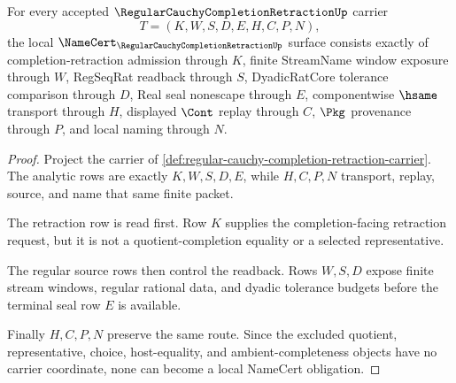 \begin{theorem}
\label{thm:regular-cauchy-completion-retraction-namecert-obligations}
For every accepted $\RegularCauchyCompletionRetractionUp$ carrier
$$
T=(K,W,S,D,E,H,C,P,N),
$$
the local $\NameCert_{\RegularCauchyCompletionRetractionUp}$ surface consists exactly of completion-retraction admission through $K$, finite StreamName window exposure through $W$, RegSeqRat readback through $S$, DyadicRatCore tolerance comparison through $D$, Real seal nonescape through $E$, componentwise $\hsame$ transport through $H$, displayed $\Cont$ replay through $C$, $\Pkg$ provenance through $P$, and local naming through $N$.
\end{theorem}
\begin{proof}
Project the carrier of \autoref{def:regular-cauchy-completion-retraction-carrier}. The analytic rows are exactly $K,W,S,D,E$, while $H,C,P,N$ transport, replay, source, and name that same finite packet.

The retraction row is read first. Row $K$ supplies the completion-facing retraction request, but it is not a quotient-completion equality or a selected representative.

The regular source rows then control the readback. Rows $W,S,D$ expose finite stream windows, regular rational data, and dyadic tolerance budgets before the terminal seal row $E$ is available.

Finally $H,C,P,N$ preserve the same route. Since the excluded quotient, representative, choice, host-equality, and ambient-completeness objects have no carrier coordinate, none can become a local NameCert obligation.
\end{proof}

